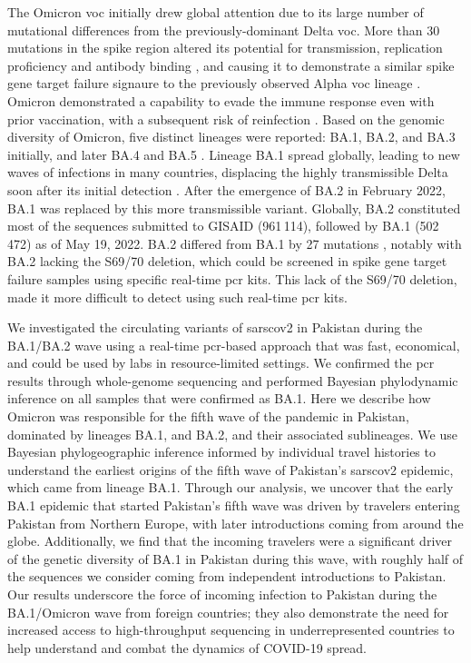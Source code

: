 The Omicron \gls{voc} initially drew global attention due to its large number of mutational differences from the previously-dominant Delta \gls{voc}.
More than 30 mutations in the spike region altered its potential for transmission, replication proficiency and antibody binding \citep{viana2022rapid}, and causing it to demonstrate a similar spike gene target failure signaure to the previously observed Alpha \gls{voc} lineage \citep{McMillen2022}.
Omicron demonstrated a capability to evade the immune response even with prior vaccination, with a subsequent risk of reinfection \citep{cele2022Omicron, lista2022p681h}.
Based on the genomic diversity of Omicron, five distinct lineages were reported: BA.1, BA.2, and BA.3 initially, and later BA.4 and BA.5 \citep{Chatterjee2023, Gangavarapu2023}.
Lineage BA.1 spread globally, leading to new waves of infections in many countries, displacing the highly transmissible Delta soon after its initial detection \citep{yamasoba2022virological}.
After the emergence of BA.2 in February 2022, BA.1 was replaced by this more transmissible variant.
Globally, BA.2 constituted most of the sequences submitted to GISAID (961\,114), followed by BA.1 (502\,472) as of May 19, 2022.
BA.2 differed from BA.1 by 27 mutations \citep{wolter2022early}, notably with BA.2 lacking the S69/70 deletion, which could be screened in spike gene target failure samples using specific real-time \gls{pcr} kits.
This lack of the S69/70 deletion, made it more difficult to detect using such real-time \gls{pcr} kits.

We investigated the circulating variants of \gls{sarscov2} in Pakistan during the BA.1/BA.2 wave using a real-time \gls{pcr}-based approach that was fast, economical, and could be used by labs in resource-limited settings.
We confirmed the \gls{pcr} results through whole-genome sequencing and performed Bayesian phylodynamic inference on all samples that were confirmed as BA.1.
Here we describe how Omicron was responsible for the fifth wave of the pandemic in Pakistan, dominated by lineages BA.1, and BA.2, and their associated sublineages.
We use Bayesian phylogeographic inference informed by individual travel histories to understand the earliest origins of the fifth wave of Pakistan's \gls{sarscov2} epidemic, which came from lineage BA.1.
Through our analysis, we uncover that the early BA.1 epidemic that started Pakistan's fifth wave was driven by travelers entering Pakistan from Northern Europe, with later introductions coming from around the globe.
Additionally, we find that the incoming travelers were a significant driver of the genetic diversity of BA.1 in Pakistan during this wave, with roughly half of the sequences we consider coming from independent introductions to Pakistan.
Our results underscore the force of incoming infection to Pakistan during the BA.1/Omicron wave from foreign countries; they also demonstrate the need for increased access to high-throughput sequencing in underrepresented countries to help understand and combat the dynamics of COVID-19 spread.


